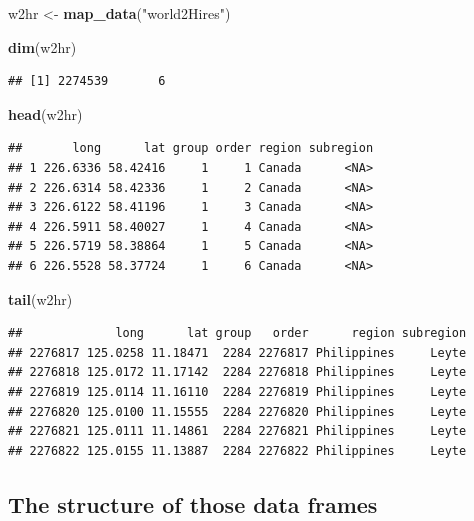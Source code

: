 \documentclass[]{book}
\newenvironment{Shaded}{\begin{snugshade}}{\end{snugshade}}
\newcommand{\KeywordTok}[1]{\textcolor[rgb]{0.13,0.29,0.53}{\textbf{{#1}}}}
\newcommand{\StringTok}[1]{\textcolor[rgb]{0.31,0.60,0.02}{{#1}}}
\newcommand{\NormalTok}[1]{{#1}}
\theoremstyle{definition}
\theoremstyle{definition}
\theoremstyle{remark}
\begin{document}
\begin{itemize}
\begin{Shaded}
\begin{Highlighting}[]
\NormalTok{w2hr <-}\StringTok{ }\KeywordTok{map_data}\NormalTok{(}\StringTok{"world2Hires"}\NormalTok{)}

\KeywordTok{dim}\NormalTok{(w2hr)}
\end{Highlighting}
\end{Shaded}

\begin{verbatim}
## [1] 2274539       6
\end{verbatim}

\begin{Shaded}
\begin{Highlighting}[]
\KeywordTok{head}\NormalTok{(w2hr)}
\end{Highlighting}
\end{Shaded}

\begin{verbatim}
##       long      lat group order region subregion
## 1 226.6336 58.42416     1     1 Canada      <NA>
## 2 226.6314 58.42336     1     2 Canada      <NA>
## 3 226.6122 58.41196     1     3 Canada      <NA>
## 4 226.5911 58.40027     1     4 Canada      <NA>
## 5 226.5719 58.38864     1     5 Canada      <NA>
## 6 226.5528 58.37724     1     6 Canada      <NA>
\end{verbatim}

\begin{Shaded}
\begin{Highlighting}[]
\KeywordTok{tail}\NormalTok{(w2hr)}
\end{Highlighting}
\end{Shaded}

\begin{verbatim}
##             long      lat group   order      region subregion
## 2276817 125.0258 11.18471  2284 2276817 Philippines     Leyte
## 2276818 125.0172 11.17142  2284 2276818 Philippines     Leyte
## 2276819 125.0114 11.16110  2284 2276819 Philippines     Leyte
## 2276820 125.0100 11.15555  2284 2276820 Philippines     Leyte
## 2276821 125.0111 11.14861  2284 2276821 Philippines     Leyte
## 2276822 125.0155 11.13887  2284 2276822 Philippines     Leyte
\end{verbatim}
\end{itemize}

\subsection{The structure of those data
frames}\label{the-structure-of-those-data-frames}
\end{document}
